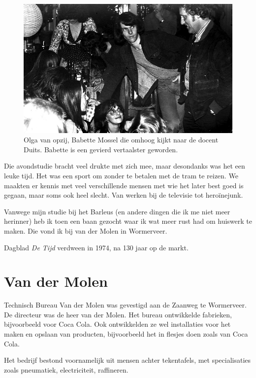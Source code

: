 \documentclass[12pt,twoside, openright]{memoir}
\begin{document}
\begin{figure}[h]
\centering
\includegraphics[width=\textwidth]{img/237aschool001}
\caption*{\footnotesize Olga van opzij, Babette Mossel die omhoog kijkt naar de docent Duits. Babette is een gevierd vertaalster geworden.}
\end{figure}

Die avondstudie bracht veel drukte met zich mee, maar desondanks was het een leuke tijd. Het was een sport om zonder te betalen met de tram te reizen. We maakten er kennis met veel verschillende mensen met wie het later best goed is gegaan, maar soms ook heel slecht. Van werken bij de televisie tot heroïnejunk.

Vanwege mijn studie bij het Barleus (en andere dingen die ik me niet meer herinner) heb ik toen een baan gezocht waar ik wat meer rust had om huiswerk te maken. Die vond ik bij van der Molen in Wormerveer.

Dagblad \emph{De Tijd} verdween in 1974, na 130 jaar op de markt.

\section*{Van der Molen} %
\label{cha:vandermolen}

Technisch Bureau Van der Molen was gevestigd aan de Zaanweg te Wormerveer. De directeur was de heer van der Molen. Het bureau ontwikkelde fabrieken, bijvoorbeeld voor Coca Cola. Ook ontwikkelden ze wel installaties voor het maken en opslaan van producten, bijvoorbeeld het in flesjes doen zoals van Coca Cola. 

Het bedrijf bestond voornamelijk uit mensen achter tekentafels, met specialisaties zoals pneumatiek, electriciteit, raffineren.
\end{document}
